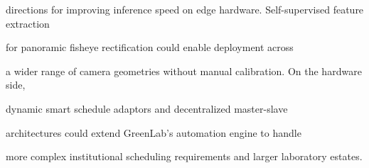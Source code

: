 directions for improving inference speed on edge hardware. Self-supervised feature extraction

for panoramic ﬁsheye rectiﬁcation \cite{rodriguez2024} could enable deployment across

a wider range of camera geometries without manual calibration. On the hardware side,

dynamic smart schedule adaptors \cite{kim2024} and decentralized master-slave

architectures \cite{nielsen2025} could extend GreenLab's automation engine to handle

more complex institutional scheduling requirements and larger laboratory estates.


